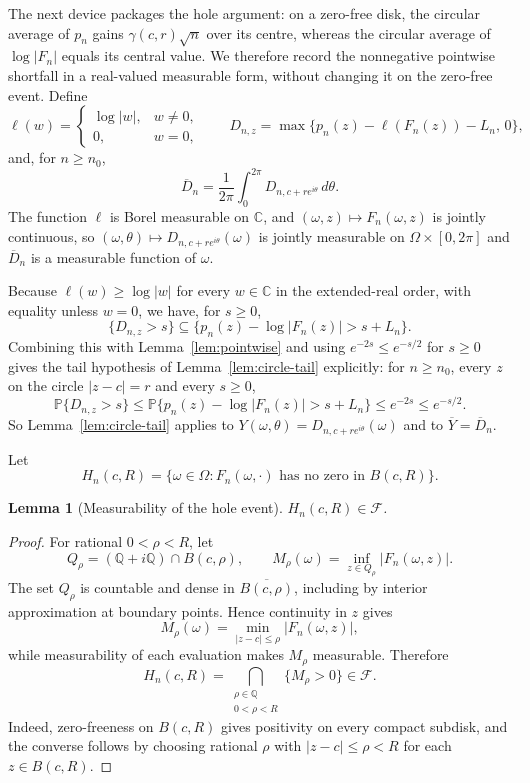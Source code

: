 \documentclass[plain]{baustms}
\newcommand{\C}{\mathbb C}
\newcommand{\Q}{\mathbb Q}
\newcommand{\Pp}{\mathbb P}
\theoremstyle{cupthm}
\newtheorem{lemma}[theorem]{Lemma}
\begin{document}
The next device packages the hole argument: on a zero-free disk, the circular
average of $p_n$ gains $\gamma(c,r)\sqrt n$ over its centre, whereas the
circular average of $\log|F_n|$ equals its central value. We therefore record
the nonnegative pointwise shortfall in a real-valued measurable form, without
changing it on the zero-free event. Define
\[
 \ell(w)=\begin{cases}\log|w|,&w\neq0,\\ 0,&w=0,\end{cases}
 \qquad
 D_{n,z}=\max\{p_n(z)-\ell(F_n(z))-L_n,\,0\},
\]
and, for $n\geq n_0$,
\[
 \overline D_n=\frac1{2\pi}\int_0^{2\pi}D_{n,c+re^{i\theta}}\,d\theta .
\]
The function $\ell$ is Borel measurable on $\C$, and $(\omega,z)\mapsto
F_n(\omega,z)$ is jointly continuous, so
$(\omega,\theta)\mapsto D_{n,c+re^{i\theta}}(\omega)$ is jointly measurable
on $\Omega\times[0,2\pi]$ and $\overline D_n$ is a measurable function of
$\omega$.

Because $\ell(w)\geq\log|w|$ for every $w\in\C$ in the
extended-real order, with equality unless $w=0$, we have, for $s\geq0$,
\[
 \{D_{n,z}>s\}\subseteq
 \{p_n(z)-\log|F_n(z)|>s+L_n\}.
\]
Combining this with Lemma~\ref{lem:pointwise} and using $e^{-2s}\leq e^{-s/2}$
for $s\geq0$ gives the tail hypothesis of Lemma~\ref{lem:circle-tail}
explicitly: for $n\geq n_0$, every $z$ on the circle $|z-c|=r$ and every
$s\geq0$,
\begin{equation}\label{eq:bridge}
 \Pp\{D_{n,z}>s\}
 \leq\Pp\{p_n(z)-\log|F_n(z)|>s+L_n\}
 \leq e^{-2s}
 \leq e^{-s/2}.
\end{equation}
So Lemma~\ref{lem:circle-tail} applies to $Y(\omega,\theta)
=D_{n,c+re^{i\theta}}(\omega)$ and to $\overline Y=\overline D_n$.

Let
\[
 H_n(c,R)=\{\omega\in\Omega:F_n(\omega,\cdot)\text{ has no zero in }B(c,R)\}.
\]

\begin{lemma}[Measurability of the hole event]\label{lem:measurable}
$H_n(c,R)\in\mathcal F$.
\end{lemma}

\begin{proof}
For rational $0<\rho<R$, let
\[
 Q_\rho=(\Q+i\Q)\cap B(c,\rho),\qquad
 M_\rho(\omega)=\inf_{z\in Q_\rho}|F_n(\omega,z)|.
\]
The set $Q_\rho$ is countable and dense in $\overline{B(c,\rho)}$, including
by interior approximation at boundary points. Hence continuity in $z$ gives
\[
 M_\rho(\omega)=\min_{|z-c|\leq\rho}|F_n(\omega,z)|,
\]
while measurability of each evaluation makes $M_\rho$ measurable. Therefore
\[
 H_n(c,R)=\bigcap_{\substack{\rho\in\Q\\0<\rho<R}}\{M_\rho>0\}
 \in\mathcal F.
\]
Indeed, zero-freeness on $B(c,R)$ gives positivity on every compact subdisk,
and the converse follows by choosing rational $\rho$ with
$|z-c|\leq\rho<R$ for each $z\in B(c,R)$.
\end{proof}
\end{document}
